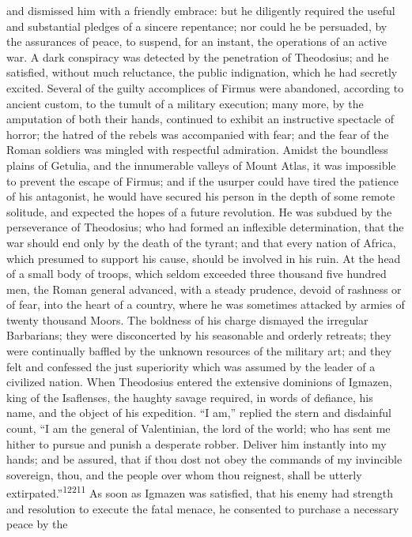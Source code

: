 {{{{{{{{{{{{{{{{{{{{{{{{{{{{{{{{{{{{{{{{{{{{{{{{{{{{{{{{{{{{{{{{{{{{{{{{{{{{{{{{{{{{{{{{{{{{{{{{{{{{{{{{{{{{{{{{{{{{{{{{{{{{{{{{{{{{and dismissed him with a friendly embrace: but he diligently
required the useful and substantial pledges of a sincere
repentance; nor could he be persuaded, by the assurances of
peace, to suspend, for an instant, the operations of an active
war. A dark conspiracy was detected by the penetration of
Theodosius; and he satisfied, without much reluctance, the public
indignation, which he had secretly excited. Several of the guilty
accomplices of Firmus were abandoned, according to ancient
custom, to the tumult of a military execution; many more, by the
amputation of both their hands, continued to exhibit an
instructive spectacle of horror; the hatred of the rebels was
accompanied with fear; and the fear of the Roman soldiers was
mingled with respectful admiration. Amidst the boundless plains
of Getulia, and the innumerable valleys of Mount Atlas, it was
impossible to prevent the escape of Firmus; and if the usurper
could have tired the patience of his antagonist, he would have
secured his person in the depth of some remote solitude, and
expected the hopes of a future revolution. He was subdued by the
perseverance of Theodosius; who had formed an inflexible
determination, that the war should end only by the death of the
tyrant; and that every nation of Africa, which presumed to
support his cause, should be involved in his ruin. At the head of
a small body of troops, which seldom exceeded three thousand five
hundred men, the Roman general advanced, with a steady prudence,
devoid of rashness or of fear, into the heart of a country, where
he was sometimes attacked by armies of twenty thousand Moors. The
boldness of his charge dismayed the irregular Barbarians; they
were disconcerted by his seasonable and orderly retreats; they
were continually baffled by the unknown resources of the military
art; and they felt and confessed the just superiority which was
assumed by the leader of a civilized nation. When Theodosius
entered the extensive dominions of Igmazen, king of the
Isaflenses, the haughty savage required, in words of defiance,
his name, and the object of his expedition. “I am,” replied the
stern and disdainful count, “I am the general of Valentinian, the
lord of the world; who has sent me hither to pursue and punish a
desperate robber. Deliver him instantly into my hands; and be
assured, that if thou dost not obey the commands of my invincible
sovereign, thou, and the people over whom thou reignest, shall be
utterly extirpated.”\textsuperscript{12211} As soon as Igmazen was satisfied, that
his enemy had strength and resolution to execute the fatal
menace, he consented to purchase a necessary peace by the
}}}}}}}}}}}}}}}}}}}}}}}}}}}}}}}}}}}}}}}}}}}}}}}}}}}}}}}}}}}}}}}}}}}}}}}}}}}}}}}}}}}}}}}}}}}}}}}}}}}}}}}}}}}}}}}}}}}}}}}}}}}}}}}}}}}}
